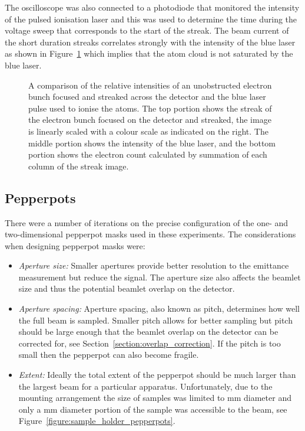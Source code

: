 The oscilloscope was also connected to a photodiode that monitored the intensity of the pulsed ionisation laser and this was used to determine the time during the voltage sweep that corresponds to the start of the streak.
The beam current of the short duration streaks correlates strongly with the intensity of the blue laser as shown in Figure~\ref{figure:blue_streak} which implies that the atom cloud is not saturated by the blue laser.

\begin{figure}
    \center
    
    \caption[Comparison between time-resolved electron count and ionisation laser power.]{A comparison of the relative intensities of an unobstructed electron bunch focused and streaked across the detector and the blue laser pulse used to ionise the atoms.
    The top portion shows the streak of the electron bunch focused on the detector and streaked, the image is linearly scaled with a colour scale as indicated on the right. The middle portion shows the intensity of the blue laser, and the bottom portion shows the electron count calculated by summation of each column of the streak image.}
    \label{figure:blue_streak}
\end{figure}

\subsection{Pepperpots}
There were a number of iterations on the precise configuration of the one- and two-dimensional pepperpot masks used in these experiments.
The considerations when designing pepperpot masks were:
\begin{itemize}
    \item{\emph{Aperture size:} Smaller apertures provide better resolution to the emittance measurement but reduce the signal. The aperture size also affects the beamlet size and thus the potential beamlet overlap on the detector.}
    \item{\emph{Aperture spacing:} Aperture spacing, also known as pitch, determines how well the full beam is sampled.
    Smaller pitch allows for better sampling but pitch should be large enough that the beamlet overlap on the detector can be corrected for, see Section~\ref{section:overlap_correction}.
    If the pitch is too small then the pepperpot can also become fragile.}
    \item{\emph{Extent:} Ideally the total extent of the pepperpot should be much larger than the largest beam for a particular apparatus.
    Unfortunately, due to the mounting arrangement the size of samples was limited to \unit[3]{mm} diameter and only a \unit[2]{mm} diameter portion of the sample was accessible to the beam, see Figure~\ref{figure:sample_holder_pepperpots}.}
\end{itemize}

